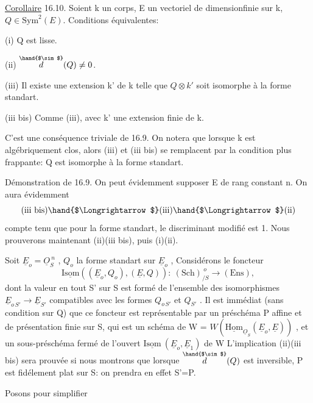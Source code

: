 \uline{Corollaire} 16.10. Soient k un corps, E un vectoriel de dimensionfinie
sur k, $Q \in \mathrm{Sym}^2(E)$. Conditions équivalentes:

(i) Q est lisse.

(ii) $\overset{\hand{$\sim$}}{d}(Q) \neq 0$.

(iii) Il existe une extension  k' de k telle que $Q\otimes k'$ soit
isomorphe à la forme standart.

(iii bis) Comme (iii), avec k' une extension finie de k.

C'est une conséquence triviale de 16.9. On notera que lorsque k est
algébriquement clos, alors (iii) et (iii bis) se remplacent par la
condition plus frappante: Q est isomorphe à la forme standart.

Démonstration de 16.9. On  peut évidemment
supposer E de rang constant n. On aura évidemment
\[ \text{(iii bis)} \hand{$\Longrightarrow$} \text{(iii)} \hand{$\Longrightarrow$} \text{(ii)} \]
compte tenu que pour la forme standart, le discriminant modifié est 1.
Nous prouverons maintenant (ii)\hand{$\Longrightarrow$}(iii bis), puis (i)\hand{$\Longleftrightarrow$}(ii).

Soit $\underline{E}_o = \underline{O}_S^{\ n}$ , $Q_o$ la forme standart sur $\underline{E}_o$ , Considérons le
foncteur
\[ \underline{\mathrm{Isom}}( (\underline{E}_o,Q_o),(\underline{E},Q)) :\ (\mathrm{Sch})_{/S}^{\ o} \longrightarrow (\mathrm{Ens}) , \]
dont la valeur en tout S' sur S est formé de l'ensemble des isomorphismes
$\underline{E}_{o\,S'} \to \underline{E}_{S'}$ compatibles avec les formes $Q_{o\,S'}$ et $Q_{S'}$ . Il est immédiat
(sans condition sur  Q) que ce foncteur est représentable par un préschéma
P affine et de présentation finie sur S, qui est un schéma de W =
$W(\underline{\mathrm{Hom}}_{\underline{O}_S}(\underline{E}_o,\underline{E}))$ , et un sous-préschéma fermé de  l'ouvert
$\underline{\mathrm{Isom}}\ (\underline{E}_o,\underline{E}_1)$ de W \unsure{/} L'implication (ii)\hand{$\Longrightarrow$}(iii bis) sera prouvée si
nous montrons que lorsque $\overset{\hand{$\sim$}}{d}(Q)$ est inversible, P est fidélement plat
sur S: on prendra en effet S'=P.

Posons pour simplifier 

